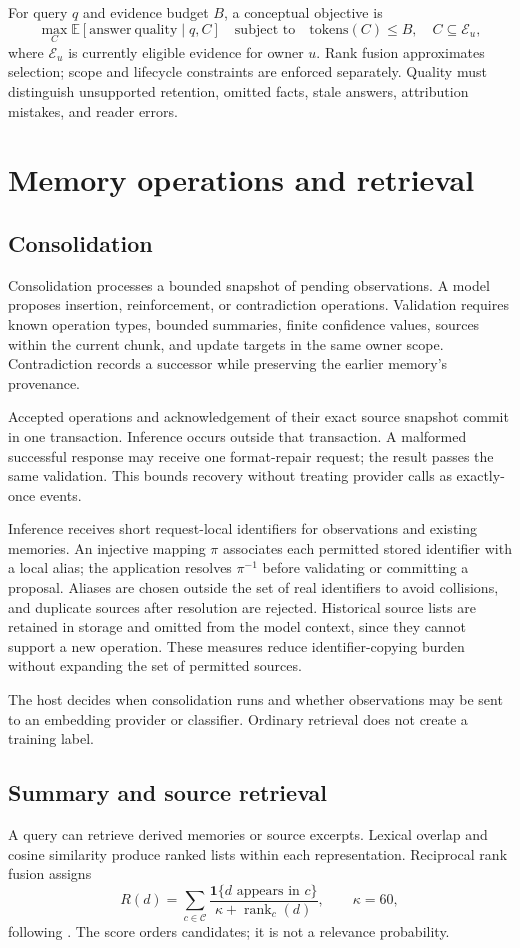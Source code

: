 \documentclass[11pt]{article}
\newcommand{\E}{\mathbb{E}}
\newcommand{\ind}{\mathbf{1}}
\begin{document}
For query $q$ and evidence budget $B$, a conceptual objective is
\[
 \max_C \E[\mathrm{answer\ quality}\mid q,C]
 \quad\text{subject to}\quad
 \mathrm{tokens}(C)\leq B,\quad C\subseteq\mathcal{E}_u,
\]
where $\mathcal{E}_u$ is currently eligible evidence for owner $u$. Rank fusion approximates selection; scope and lifecycle constraints are enforced separately. Quality must distinguish unsupported retention, omitted facts, stale answers, attribution mistakes, and reader errors.

\section{Memory operations and retrieval}
\subsection{Consolidation}
Consolidation processes a bounded snapshot of pending observations. A model proposes insertion, reinforcement, or contradiction operations. Validation requires known operation types, bounded summaries, finite confidence values, sources within the current chunk, and update targets in the same owner scope. Contradiction records a successor while preserving the earlier memory's provenance.

Accepted operations and acknowledgement of their exact source snapshot commit in one transaction. Inference occurs outside that transaction. A malformed successful response may receive one format-repair request; the result passes the same validation. This bounds recovery without treating provider calls as exactly-once events.

Inference receives short request-local identifiers for observations and existing memories. An injective mapping $\pi$ associates each permitted stored identifier with a local alias; the application resolves $\pi^{-1}$ before validating or committing a proposal. Aliases are chosen outside the set of real identifiers to avoid collisions, and duplicate sources after resolution are rejected. Historical source lists are retained in storage and omitted from the model context, since they cannot support a new operation. These measures reduce identifier-copying burden without expanding the set of permitted sources.

The host decides when consolidation runs and whether observations may be sent to an embedding provider or classifier. Ordinary retrieval does not create a training label.

\subsection{Summary and source retrieval}
A query can retrieve derived memories or source excerpts. Lexical overlap and cosine similarity produce ranked lists within each representation. Reciprocal rank fusion assigns
\[
 R(d)=\sum_{c\in\mathcal{C}}
 \frac{\ind\{d\text{ appears in }c\}}{\kappa+\operatorname{rank}_c(d)},
 \qquad \kappa=60,
\]
following \citet{rrf}. The score orders candidates; it is not a relevance probability.
\end{document}
